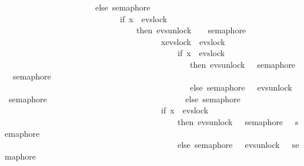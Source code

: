 \begin{isabellebody}
\ \ \ \ \ \ \ \ \ \ \ \ \ \ \ \ \ \ \ \ \ \ else\ semaphore\ {}\ \isanewline
\ \ \ \ \ \ \ \ \ \ \ \ \ \ \ \ \ \ \ \ \ \ \ \ \ \ \ {\isacharbar}{\kern0pt}{\isacharbar}{\kern0pt}{\isacharbar}{\kern0pt}\ {\isacharparenleft}{\kern0pt}if\ x\ {\isacharequal}{\kern0pt}\ evs{\isachardot}{\kern0pt}lock\ {}\isanewline
\ \ \ \ \ \ \ \ \ \ \ \ \ \ \ \ \ \ \ \ \ \ \ \ \ \ \ \ \ \ \ \ then\ evs{\isachardot}{\kern0pt}unlock\ {}\ {\isasymrightarrow}\ \ semaphore\ {}\ \isanewline
\ \ \ \ \ \ \ \ \ \ \ \ \ \ \ \ \ \ \ \ \ \ \ \ \ \ \ \ \ \ \ \ \ \ \ \ \ {\isacharbar}{\kern0pt}{\isacharbar}{\kern0pt}{\isacharbar}{\kern0pt}\ {\isasymbox}x{\isasymin}{\isacharbraceleft}{\kern0pt}evs{\isachardot}{\kern0pt}lock\ {}{\isacharcomma}{\kern0pt}\ evs{\isachardot}{\kern0pt}lock\ {}{\isacharbraceright}{\kern0pt}\isanewline
\ \ \ \ \ \ \ \ \ \ \ \ \ \ \ \ \ \ \ \ \ \ \ \ \ \ \ \ \ \ \ \ \ \ \ \ \ \ \ \ \ {\isasymrightarrow}\ {\isacharparenleft}{\kern0pt}if\ x\ {\isacharequal}{\kern0pt}\ evs{\isachardot}{\kern0pt}lock\ {}\ \isanewline
\ \ \ \ \ \ \ \ \ \ \ \ \ \ \ \ \ \ \ \ \ \ \ \ \ \ \ \ \ \ \ \ \ \ \ \ \ \ \ \ \ \ \ \ \ then\ evs{\isachardot}{\kern0pt}unlock\ {}\ {\isasymrightarrow}\ semaphore\ {}\ {\isacharbar}{\kern0pt}{\isacharbar}{\kern0pt}{\isacharbar}{\kern0pt}\ semaphore\ {}\isanewline
\ \ \ \ \ \ \ \ \ \ \ \ \ \ \ \ \ \ \ \ \ \ \ \ \ \ \ \ \ \ \ \ \ \ \ \ \ \ \ \ \ \ \ \ \ else\ semaphore\ {}\ {\isacharbar}{\kern0pt}{\isacharbar}{\kern0pt}{\isacharbar}{\kern0pt}\ evs{\isachardot}{\kern0pt}unlock\ {}\ {\isasymrightarrow}\ semaphore\ {}{\isacharparenright}{\kern0pt}\isanewline
\ \ \ \ \ \ \ \ \ \ \ \ \ \ \ \ \ \ \ \ \ \ \ \ \ \ \ \ \ \ \ \ else\ semaphore\ {}\ \isanewline
\ \ \ \ \ \ \ \ \ \ \ \ \ \ \ \ \ \ \ \ \ \ \ \ \ \ \ \ \ \ \ \ \ \ \ \ \ {\isacharbar}{\kern0pt}{\isacharbar}{\kern0pt}{\isacharbar}{\kern0pt}\ {\isacharparenleft}{\kern0pt}if\ x\ {\isacharequal}{\kern0pt}\ evs{\isachardot}{\kern0pt}lock\ {}\ \isanewline
\ \ \ \ \ \ \ \ \ \ \ \ \ \ \ \ \ \ \ \ \ \ \ \ \ \ \ \ \ \ \ \ \ \ \ \ \ \ \ \ \ \ then\ evs{\isachardot}{\kern0pt}unlock\ {}\ {\isasymrightarrow}\ semaphore\ {}\ {\isacharbar}{\kern0pt}{\isacharbar}{\kern0pt}{\isacharbar}{\kern0pt}\ semaphore\ {}\isanewline
\ \ \ \ \ \ \ \ \ \ \ \ \ \ \ \ \ \ \ \ \ \ \ \ \ \ \ \ \ \ \ \ \ \ \ \ \ \ \ \ \ \ else\ semaphore\ {}\ {\isacharbar}{\kern0pt}{\isacharbar}{\kern0pt}{\isacharbar}{\kern0pt}\ evs{\isachardot}{\kern0pt}unlock\ {}\ {\isasymrightarrow}\ semaphore\ {}{\isacharparenright}{\kern0pt}{\isacharparenright}{\kern0pt}{\isacharparenright}{\kern0pt}\ \isanewline

\end{isabellebody}
